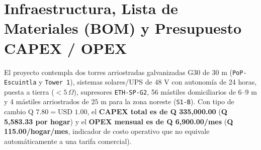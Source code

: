 \documentclass[10pt,letterpaper]{article}
\begin{document}
\section{Infraestructura, Lista de Materiales (BOM) y Presupuesto CAPEX / OPEX}

El proyecto contempla dos torres arriostradas galvanizadas G30 de $30\text{ m}$ (\texttt{PoP-Escuintla} y \texttt{Tower 1}), sistemas solares/UPS de $48\text{ V}$ con autonomía de 24 horas, puesta a tierra ($<5\,\Omega$), supresores \texttt{ETH-SP-G2}, 56 mástiles domiciliarios de $6\text{--}9\text{ m}$ y 4 mástiles arriostrados de $25\text{ m}$ para la zona noreste (\texttt{S1-B}). Con tipo de cambio $\text{Q } 7.80 = \text{USD } 1.00$, el \textbf{CAPEX total es de Q 335,000.00} (\textbf{Q 5,583.33 por hogar}) y el \textbf{OPEX mensual es de Q 6,900.00/mes} (\textbf{Q 115.00/hogar/mes}, indicador de costo operativo que no equivale automáticamente a una tarifa comercial).
\end{document}
